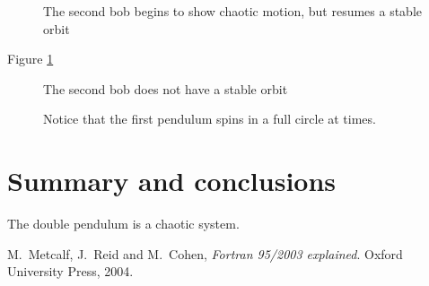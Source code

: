 \documentclass[12pt]{article}
\begin{document}
\begin {figure}[!htb]
	\resizebox{\columnwidth}{!}{}
	\caption{The second bob begins to show chaotic motion, but resumes a stable orbit }
	\label{dobulepend2}
\end {figure}
Figure \ref{dobulepend2}

\begin {figure}[!htb]
	\resizebox{\columnwidth}{!}{}
	\caption{The second bob does not have a stable orbit }
	\label{dobulepend3}
\end {figure}

\begin {figure}[!htb]
	\resizebox{\columnwidth}{!}{}
	\caption{Notice that the first pendulum spins in a full circle at times.  }
	\label{dobulepend3}
\end {figure}


\section{Summary and conclusions}

The double pendulum is a chaotic system.

\begin{thebibliography}{}


 M.\ Metcalf, J.\ Reid and M.\ Cohen, {\it Fortran 95/2003 explained}. Oxford University Press, 2004.
 

\end{thebibliography}
\end{document}
